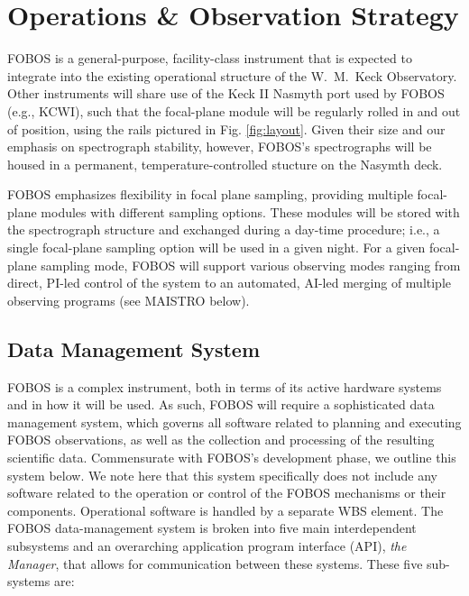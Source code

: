 \documentclass[oneside,11pt]{amsart}
\begin{document}
\section{Operations \& Observation Strategy}
\label{sec:ops}


FOBOS is a general-purpose, facility-class instrument that is
expected to integrate into the existing operational structure of the
W.~M.~Keck Observatory. Other instruments will share use of the Keck
II Nasmyth port used by FOBOS (e.g., KCWI), such that the focal-plane
module will be regularly rolled in and out of position, using the
rails pictured in Fig. \ref{fig:layout}. Given their size and our
emphasis on spectrograph stability, however, FOBOS's spectrographs
will be housed in a permanent, temperature-controlled stucture on the
Nasymth deck.

FOBOS emphasizes flexibility in focal plane sampling, providing
multiple focal-plane modules with different sampling options. These
modules will be stored with the spectrograph structure and exchanged
during a day-time procedure; i.e., a single focal-plane sampling
option will be used in a given night. For a given focal-plane
sampling mode, FOBOS will support various observing modes ranging
from direct, PI-led control of the system to an automated, AI-led
merging of multiple observing programs (see MAISTRO below).


\subsection{Data Management System}

FOBOS is a complex instrument, both in terms of its active hardware
systems and in how it will be used. As such, FOBOS will require a
sophisticated data management system, which governs all software
related to planning and executing FOBOS observations, as well as the
collection and processing of the resulting scientific data.
Commensurate with FOBOS's development phase, we outline this system
below. We note here that this system specifically does not include
any software related to the operation or control of the FOBOS
mechanisms or their components. Operational software is handled by a
separate WBS element. The FOBOS data-management system is broken into
five main interdependent subsystems and an overarching application
program interface (API), {\it the Manager}, that allows for
communication between these systems. These five sub-systems are:
\end{document}
